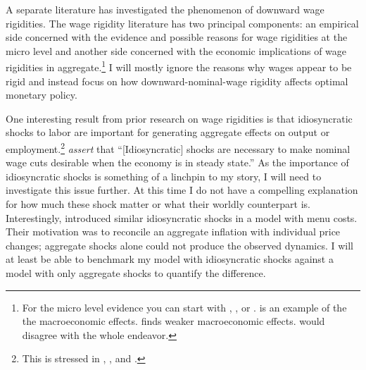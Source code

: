 \documentclass[12pt,a4paper]{article}            %
\begin{document}

A separate literature has investigated the phenomenon of downward wage rigidities.
The wage rigidity literature has two principal components: an empirical side concerned with the evidence and possible reasons for wage rigidities at the micro level and another side concerned with the economic implications of wage rigidities in aggregate.\footnote{For the micro level evidence you can start with \cite{dickens_et_al_2006}, \cite{akerlof_dickens_perry_1996}, or \cite{card_hyslop_1997}. \cite{erceg_henderson_levin_1999} is an example of the the macroeconomic effects.  \cite{elsby_2009} finds weaker macroeconomic effects. \cite{chari_kehoe_macgratten_2009} would disagree with the whole endeavor.}
I will mostly ignore the reasons why wages appear to be rigid and instead focus on how downward-nominal-wage rigidity affects optimal monetary policy.

One interesting result from prior research on wage rigidities is that idiosyncratic shocks to labor are important for generating aggregate effects on output or employment.\footnote{This is stressed in \cite{elsby_2009}, \cite{benigno_ricci_2011}, and \cite{daly_hobijn_2013}.}
\cite{daly_hobijn_2013} \emph{assert} that ``[Idiosyncratic] shocks are necessary to make nominal wage cuts desirable when the economy is in steady state.''
As the importance of idiosyncratic shocks is something of a linchpin to my story, I will need to investigate this issue further.
At this time I do not have a compelling explanation for how much these shock matter or what their worldly counterpart is.
Interestingly, \cite{golosov_lucas_2007} introduced similar idiosyncratic shocks in a model with menu costs.
Their motivation was to reconcile an aggregate inflation with individual price changes;
aggregate shocks alone could not produce the observed dynamics.
I will at least be able to benchmark my model with idiosyncratic shocks against a model with only aggregate shocks to quantify the difference.

\end{document}
